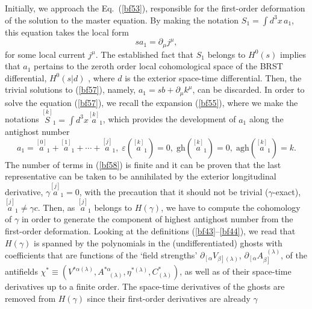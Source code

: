 \documentclass[a4paper,11pt]{article}
\begin{document}
Initially, we approach the Eq.~(\ref{bf53}), responsible for the first-order
deformation of the solution to the master equation. By making the notation $%
S_{1}=\int d^{3}x\,a_{1}$, this equation takes the local form
\begin{equation}
sa_{1}=\partial _{\mu }j^{\mu },  \label{bf57}
\end{equation}
for some local current $j^{\mu }$. The established fact that $S_{1}$ belongs
to $H^{0}\left( s\right) $ implies that $a_{1}$ pertains to the zeroth order
local cohomological space of the BRST differential, $H^{0}\left( s|d\right) $%
, where $d$ is the exterior space-time differential. Then, the trivial
solutions to (\ref{bf57}), namely, $a_{1}=sb+\partial _{\mu }k^{\mu }$, can
be discarded. In order to solve the equation (\ref{bf57}), we recall the
expansion (\ref{bf55}), where we make the notations $\stackrel{[k]}{S}%
_{1}=\int d^{3}x\stackrel{[k]}{a}_{1}$, which provides the development of $%
a_{1}$ along the antighost number
\begin{equation}
a_{1}=\stackrel{[0]}{a}_{1}+\stackrel{[1]}{a}_{1}+\cdots +\stackrel{[j]}{a}%
_{1},\;\varepsilon \left( \stackrel{[k]}{a}_{1}\right) =0,\;\mathrm{gh}%
\left( \stackrel{[k]}{a}_{1}\right) =0,\;\mathrm{agh}\left( \stackrel{[k]}{a}%
_{1}\right) =k.  \label{bf58}
\end{equation}
The number of terms in (\ref{bf58}) is finite and it can be proven that the
last representative can be taken to be annihilated by the exterior
longitudinal derivative, $\gamma \stackrel{[j]}{a}_{1}=0$, with the
precaution that it should not be trivial ($\gamma $-exact), $\stackrel{[j]}{a%
}_{1}\neq \gamma c$. Then, as $\stackrel{[j]}{a}_{1}$ belongs to $H\left(
\gamma \right) $, we have to compute the cohomology of $\gamma $ in order to
generate the component of highest antighost number from the first-order
deformation. Looking at the definitions (\ref{bf43}--\ref{bf44}), we read
that $H\left( \gamma \right) $ is spanned by the polynomials in the
(undifferentiated) ghosts with coefficients that are functions of the `field
strengths' $\partial _{\left[ \alpha \right. }V_{\left. \beta \right]
(\lambda )}$, $\partial _{\left[ \alpha \right. }A_{\left. \beta \right]
}^{\;\;(\lambda )}$, of the antifields $\chi ^{*}\equiv \left( V^{*\alpha
(\lambda )},A_{\;\;\;(\lambda )}^{*\alpha },\eta ^{*(\lambda )},C_{(\lambda
)}^{*}\right) $, as well as of their space-time derivatives up to a finite
order. The space-time derivatives of the ghosts are removed from $H\left(
\gamma \right) $ since their first-order derivatives are already $\gamma $%
\end{document}
